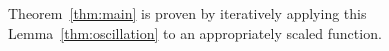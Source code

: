 Theorem~\ref{thm:main} is proven by iteratively applying this Lemma~\ref{thm:oscillation} to an appropriately scaled function.  




%
%
%
%